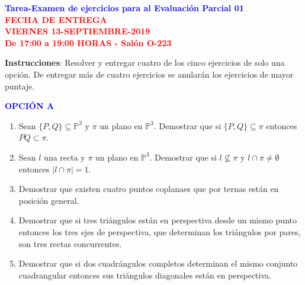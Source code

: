 \documentclass[12pt]{report}
\numberwithin{section}{chapter}
\newcommand{\p}{\mathbb P}
\begin{document}
\begin{center}
\textcolor{blue}{\textbf{\large Tarea-Examen de ejercicios para al Evaluación Parcial 01}}\\
\vspace{0.5 cm}
\textcolor{red}{\textbf{\large FECHA DE ENTREGA \\ VIERNES 13-SEPTIEMBRE-2019\\ De 17:00 a 19:00 HORAS - Salón O-223}}
\end{center}

\textbf{Instrucciones}: Resolver y entregar cuatro de los cinco ejercicios de solo una opción. De entregar más de cuatro ejercicios se anularán los ejercicios de mayor puntaje.

\vspace{1cm}


\begin{center}
\textcolor{blue}{\textbf{\large OPCIÓN A}}
\end{center}


\begin{enumerate}
\item Sean $\{P,Q\} \subseteq \p^3$ y $\pi$ un plano en $\p^3$. Demostrar que si $\{P,Q\} \subseteq \pi$ entonces $\overline{PQ}\subset \pi$.


\item Sean $l$ una recta y $\pi$ un plano en $\p^3$. Demostrar que si $l \not\subseteq \pi$ y $l \cap \pi \neq \emptyset$ entonces $|l\cap \pi|= 1$.


\item Demostrar que existen cuatro puntos coplanaes que por ternas están en posición general.


\item Demostrar que si tres triángulos están en perspectiva desde un mismo punto entonces los tres ejes de perspectiva, que determinan los triángulos por pares, son tres rectas concurrentes.


\item Demostrar que si dos cuadrángulos completos determinan el mismo conjunto cuadrangular entonces sus triángulos diagonales están en perspectiva.

\end{enumerate}
\end{document}
